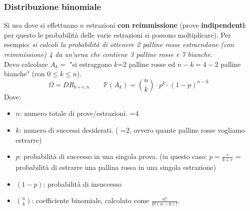 \documentclass[12pt]{extarticle} %
\begin{document}
\subsubsection{Distribuzione binomiale}
Si usa dove si effettuano $n$ estrazioni \textbf{con reimmissione} (prove \textbf{indipendenti}: per questo le probabilità delle varie estrazioni si possono moltiplicare). Per esempio: \textit{si calcoli la probabilità di ottenere 2 palline rosse estraendone (con reimmissione) 4 da un’urna che contiene 3 palline rosse e 7 bianche}.\\ Devo calcolare $A_k =$ "si estraggono $k$=2 palline rosse ed $n-k=4-2$ palline bianche" (con $0 \le k \le n$).
$$\Omega = DR_{b+r,n} \quad \quad \mathbb{P}(A_k) = {\binom{n}{k} \cdot p^k \cdot(1-p)^{n-k}}$$
Dove:
\begin{itemize}
    \item $n$: numero totale di prove/estrazioni. {\footnotesize =4}
    \item $k$: numero di successi desiderati. {\footnotesize ( =2, ovvero quante palline rosse vogliamo estrarre)}
    \item $p$: probabilità di successo in una singola prova. {\footnotesize (in questo caso: $p = \frac{r}{b+r}$ = probabilità di estrarre una pallina rossa in una singola estrazione)}
    \item $(1 - p)$: probabilità di insuccesso
    \item $\binom{n}{k}$: coefficiente binomiale, calcolato come $\frac{n!}{k!(n-k)!}$.
\end{itemize}
\end{document}
